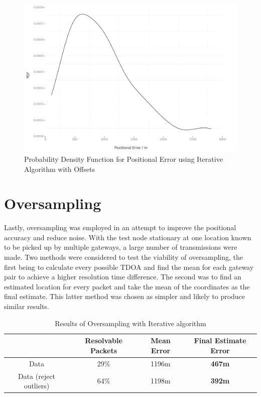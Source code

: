 \documentclass[a4paper]{report}
\begin{document}
    \begin{figure}[ht]
    \centering
    \includegraphics[width=12cm]{figures/iterativeoffseterrorpdf.png}
    \caption{Probability Density Function for Positional Error using Iterative Algorithm with Offsets}
    \label{fig:iterrorpdf}
    \end{figure}


  \section{Oversampling}

    Lastly, oversampling was employed in an attempt to improve the positional accuracy and reduce noise. With the test node stationary at one location known to be picked up by multiple gateways, a large number of transmissions were made. Two methods were considered to test the viability of oversampling, the first being to calculate every possible TDOA and find the mean for each gateway pair to achieve a higher resolution time difference. The second was to find an estimated location for every packet and take the mean of the coordinates as the final estimate. This latter method was chosen as simpler and likely to produce similar results.

    \begin{table}[ht]
      \begin{center}
        \caption{Results of Oversampling with Iterative algorithm}
        \label{tab:osresults}
        \begin{tabular}{|c|c|c|>{\bfseries}c|}
          \hline
           & Resolvable Packets & Mean Error &  Final Estimate Error \\
          \hline
          Data & 29\% & 1196m & 467m \\
          \hline
          Data (reject outliers) & 64\% & 1198m & 392m \\
          \hline
        \end{tabular}
      \end{center}
    \end{table}
\end{document}
